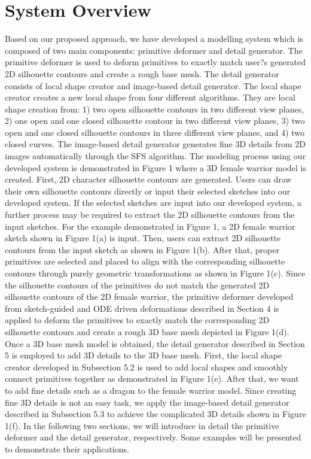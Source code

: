 \documentclass[10pt,twocolumn,letterpaper]{article}
\begin{document}
\section{System Overview}
Based on our proposed approach, we have developed a modelling system which is composed of two main components: primitive deformer and detail generator. The primitive deformer is used to deform primitives to exactly match user?s generated 2D silhouette contours and create a rough base mesh. The detail generator consists of local shape creator and image-based detail generator. The local shape creator creates a new local shape from four different algorithms. They are local shape creation from: 1) two open silhouette contours in two different view planes, 2) one open and one closed silhouette contour in two different view planes, 3) two open and one closed silhouette contours in three different view planes, and 4) two closed curves. The image-based detail generator generates fine 3D details from 2D images automatically through the SFS algorithm.  
The modeling process using our developed system is demonstrated in Figure 1 where a 3D female warrior model is created. 
First, 2D character silhouette contours are generated. Users can draw their own silhouette contours directly or input their selected sketches into our developed system. If the selected sketches are input into our developed system, a further process may be required to extract the 2D silhouette contours from the input sketches. For the example demonstrated in Figure 1, a 2D female warrior sketch shown in Figure 1(a) is input. Then, users can extract 2D silhouette contours from the input sketch as shown in Figure 1(b). After that, proper primitives are selected and placed to align with the corresponding silhouette contours through purely geometric transformations as shown in Figure 1(c). Since the silhouette contours of the primitives do not match the generated 2D silhouette contours of the 2D female warrior, the primitive deformer developed from sketch-guided and ODE driven deformations described in Section 4 is applied to deform the primitives to exactly match the corresponding 2D silhouette contours and create a rough 3D base mesh depicted in Figure 1(d). 
Once a 3D base mesh model is obtained, the detail generator described in Section 5 is employed to add 3D details to the 3D base mesh. First, the local shape creator developed in Subsection 5.2 is used to add local shapes and smoothly connect primitives together as demonstrated in Figure 1(e). After that, we want to add fine details such as a dragon to the female warrior model. Since creating fine 3D details is not an easy task, we apply the image-based detail generator described in Subsection 5.3 to achieve the complicated 3D details shown in Figure 1(f).
In the following two sections, we will introduce in detail the primitive deformer and the detail generator, respectively. Some examples will be presented to demonstrate their applications.
\end{document}
